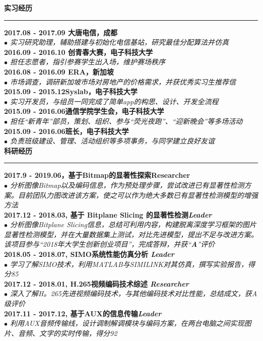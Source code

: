 \documentclass[a4paper,11pt,final]{memoir}
\newcommand{\myThemeColor}{RoyalBlue}
\newcommand{\SmallSep}{\vspace{0.9em}}
\newcommand{\CVSection}[1]
	{\Large\textbf{#1}\par
	\vspace{0.2cm}\normalsize\normalfont}
\newcommand{\CVItem}[1]
	{\textbf{\color{\myThemeColor} #1}}
\begin{document}
\begin{CJK*}{UTF8}{gbsn}
\CVSection{实习经历}
\hrule
\SmallSep
\CVItem{2017.08 - 2017.09 \hfill 大唐电信，成都}\\
\textit{$\bullet$ 实习研究助理，辅助搭建与初始化电信基站，研究最佳分配算法并仿真}
\\
\CVItem{2016.09 - 2016.10 \hfill 创青春大赛，电子科技大学}\\
\textit{$\bullet$ 担任志愿者，指引参赛学生出入场，维护赛场秩序}
\\
\CVItem{2016.08 - 2016.09 \hfill ERA，新加坡}\\
\textit{$\bullet$ 市场调查，调研新加坡市场对房地产的价格需求，并获优秀实习生推荐信} 
\\
\CVItem{2015.09 - 2015.12\hfill Syslab，电子科技大学}\\
\textit{$\bullet$ 实习开发员，与组员一同完成了简单app的构思、设计、开发全流程}
\\
\CVItem{2015.09 - 2016.06\hfill 通信学院学生会，电子科技大学}\\
\textit{$\bullet$ 担任“新青年”部员，策划、组织、参与“荧光夜跑”、“迎新晚会”等多场活动}
\\
\CVItem{2015.09 - 2016.06\hfill 班长，电子科技大学}\\
\textit{$\bullet$ 负责班级建设、管理、活动组织等多项事务，与同学建立良好友谊}
\\

\CVSection{科研经历}
\hrule
\SmallSep
\CVItem{2017.9 - 2019.06，基于Bitmap的显著性探索\hfill\emph{}Researcher}\\
\textit{$\bullet$ 分析图像Bitmap以及编码信息，作为预处理步骤，尝试改进已有显著性检测方案。目前团队力图改进该方案，使之可以作为绝大多数已有显著性检测模型的增强方法} 
\\
\CVItem{2017.12 - 2018.03, 基于 Bitplane Slicing 的显著性检测\hfill\emph{Leader}}\\
\textit{$\bullet$ 分析图像Bitplane Slicing信息，总结可利用内容，构建脱离深度学习框架的图片显著性检测模型，并在大量数据集上测试，对比先进模型，提出不足与改进方案。该项目参与“2018年大学生创新创业项目”，完成答辩，并获“\textbf{A}”评价} 
\\
\CVItem{2018.05 - 2018.07, SIMO系统性能仿真分析 \hfill\emph{Leader}}\\
\textit{$\bullet$ 学习了解SIMO技术，利用MATLAB与SIMILINK对其仿真，撰写实验报告，得分85} 
\\
\CVItem{2017.12 - 2018.01, H.265视频编码技术综述 \hfill\emph{Researcher}}\\
\textit{$\bullet$ 深入了解H。265先进视频编码技术，与其他编码技术对比性能，总结成文，获A级评价} 
\\
\CVItem{2017.11 - 2017.12, 基于AUX的信息传输\hfill\emph{Leader}}\\
\textit{$\bullet$ 利用AUX音频传输线，设计调制解调模块与编码方案，在两台电脑之间实现图片、音频、文字的实时传输，得分92}
\\


\end{CJK*}
\end{document}

